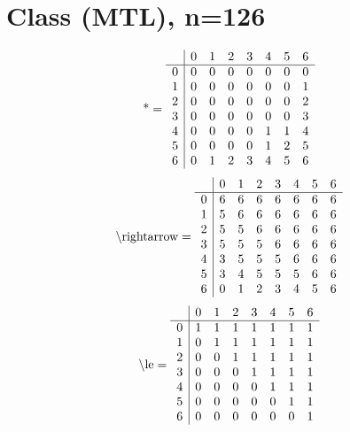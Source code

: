 \documentclass[11pt]{article}
\begin{document}
\section{Class (MTL), n=126}
\[\text{*} = 
\begin{array}{r | r r r r r r r}
 & 0 & 1 & 2 & 3 & 4 & 5 & 6 \\ \hline
0 & 0 & 0 & 0 & 0 & 0 & 0 & 0 \\
1 & 0 & 0 & 0 & 0 & 0 & 0 & 1 \\
2 & 0 & 0 & 0 & 0 & 0 & 0 & 2 \\
3 & 0 & 0 & 0 & 0 & 0 & 0 & 3 \\
4 & 0 & 0 & 0 & 0 & 1 & 1 & 4 \\
5 & 0 & 0 & 0 & 0 & 1 & 2 & 5 \\
6 & 0 & 1 & 2 & 3 & 4 & 5 & 6 \\
\end{array}
\]
\[\text{\textbackslash rightarrow} = 
\begin{array}{r | r r r r r r r}
 & 0 & 1 & 2 & 3 & 4 & 5 & 6 \\ \hline
0 & 6 & 6 & 6 & 6 & 6 & 6 & 6 \\
1 & 5 & 6 & 6 & 6 & 6 & 6 & 6 \\
2 & 5 & 5 & 6 & 6 & 6 & 6 & 6 \\
3 & 5 & 5 & 5 & 6 & 6 & 6 & 6 \\
4 & 3 & 5 & 5 & 5 & 6 & 6 & 6 \\
5 & 3 & 4 & 5 & 5 & 5 & 6 & 6 \\
6 & 0 & 1 & 2 & 3 & 4 & 5 & 6 \\
\end{array}
\]
\[\text{\textbackslash le} = 
\begin{array}{r | r r r r r r r}
 & 0 & 1 & 2 & 3 & 4 & 5 & 6 \\ \hline
0 & 1 & 1 & 1 & 1 & 1 & 1 & 1 \\
1 & 0 & 1 & 1 & 1 & 1 & 1 & 1 \\
2 & 0 & 0 & 1 & 1 & 1 & 1 & 1 \\
3 & 0 & 0 & 0 & 1 & 1 & 1 & 1 \\
4 & 0 & 0 & 0 & 0 & 1 & 1 & 1 \\
5 & 0 & 0 & 0 & 0 & 0 & 1 & 1 \\
6 & 0 & 0 & 0 & 0 & 0 & 0 & 1 \\
\end{array}
\]
\end{document}
